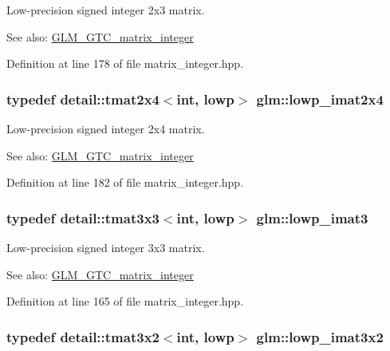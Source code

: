 Low-precision signed integer 2x3 matrix. \begin{Desc}
\item[See also:]\hyperlink{group__gtc__matrix__integer}{GLM\_\-GTC\_\-matrix\_\-integer} \end{Desc}


Definition at line 178 of file matrix\_\-integer.hpp.\hypertarget{group__gtc__matrix__integer_g4d859ef48cdfb15b2c9acc98064dd272}{
\subsubsection[lowp\_\-imat2x4]{\setlength{\rightskip}{0pt plus 5cm}typedef detail::tmat2x4$<$int, lowp$>$ {\bf glm::lowp\_\-imat2x4}}}
\label{group__gtc__matrix__integer_g4d859ef48cdfb15b2c9acc98064dd272}


Low-precision signed integer 2x4 matrix. \begin{Desc}
\item[See also:]\hyperlink{group__gtc__matrix__integer}{GLM\_\-GTC\_\-matrix\_\-integer} \end{Desc}


Definition at line 182 of file matrix\_\-integer.hpp.\hypertarget{group__gtc__matrix__integer_g149b90591e7275193c85cc08acbf0024}{
\subsubsection[lowp\_\-imat3]{\setlength{\rightskip}{0pt plus 5cm}typedef detail::tmat3x3$<$int, lowp$>$ {\bf glm::lowp\_\-imat3}}}
\label{group__gtc__matrix__integer_g149b90591e7275193c85cc08acbf0024}


Low-precision signed integer 3x3 matrix. \begin{Desc}
\item[See also:]\hyperlink{group__gtc__matrix__integer}{GLM\_\-GTC\_\-matrix\_\-integer} \end{Desc}


Definition at line 165 of file matrix\_\-integer.hpp.\hypertarget{group__gtc__matrix__integer_g250780f2be05f698b881b04ba7ce0452}{
\subsubsection[lowp\_\-imat3x2]{\setlength{\rightskip}{0pt plus 5cm}typedef detail::tmat3x2$<$int, lowp$>$ {\bf glm::lowp\_\-imat3x2}}}
\label{group__gtc__matrix__integer_g250780f2be05f698b881b04ba7ce0452}


